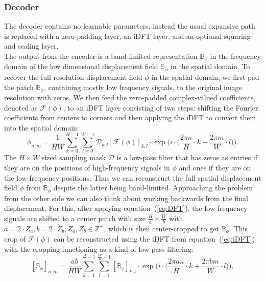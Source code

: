\documentclass[english,version-2022-01]{uzl-thesis} %
\begin{document}
\subsubsection{Decoder} \label{SubSubSec:Decoder}
The decoder contains no learnable parameters, instead the usual expansive path is replaced with a zero-padding layer, an iDFT layer, and an optional squaring and scaling layer. \\
The output from the encoder is a band-limited representation $\mathbb{B}_\phi$ in the frequency domain of the low dimensional displacement field $\mathbb{S}_\phi$ in the spatial domain. To recover the full-resolution displacement field $\phi$ in the spatial domain, we first pad the patch $\mathbb{B}_\phi$, containing mostly low frequency signals, to the original image resolution with zeros. We then feed the zero-padded complex-valued coefficients, denoted as $\mathcal{F}(\phi)$, to an iDFT layer consisting of two steps: shifting the Fourier coefficients from centers to corners and then applying the iDFT to convert them into the spatial domain:
\begin{equation} \label{eq:iDFT}
	\phi_{n,m} = \frac{1}{HW} \sum^{H-1}_{k=0} \sum^{W-1}_{l=0} \mathcal{D}_{k,l} [\mathcal{F}(\phi)]_{k,l} \cdot \exp \Bigg(i \cdot \bigg(\frac{2 \pi n}{H} \cdot k + \frac{2 \pi m}{W} \cdot l \bigg) \Bigg).
\end{equation}
The $H \times W$ sized sampling mask $\mathcal{D}$ is a low-pass filter that has zeros as entries if they are on the positions of high-frequency signals in $\phi$ and ones if they are on the low-frequency positions. Thus we can reconstruct the full spatial displacement field $\phi$ from $\mathbb{B}_\phi$ despite the latter being band-limited. Approaching the problem from the other side we can also think about working backwards from the final displacement. For this, after applying equation~(\ref{eq:DFT}), the low-frequency signals are shifted to a center patch with size $\frac{H}{a} \times \frac{W}{b}$ with $a = 2 \cdot Z_a, b = 2 \cdot Z_b, Z_a, Z_b \in \mathbb{Z}^+$, which is then center-cropped to get $\mathbb{B}_\phi$. This crop of $\mathcal{F}(\phi)$ can be reconstructed using the iDFT from equation~(\ref{eq:iDFT}) with the cropping functioning as a kind of low-pass filtering:
\begin{equation} \label{eq:decoder}
	[\mathbb{S}_\phi]_{n,m} = \frac{ab}{HW} \sum^{\frac{H}{a}-1}_{k=1} \sum^{\frac{W}{b}-1}_{l=1} [\mathbb{B}_\phi]_{k,l} \cdot \exp \Bigg(i \cdot \bigg(\frac{2 \pi a n}{H} \cdot k + \frac{2 \pi b m}{W} \cdot l \bigg) \Bigg),
\end{equation}
\end{document}
